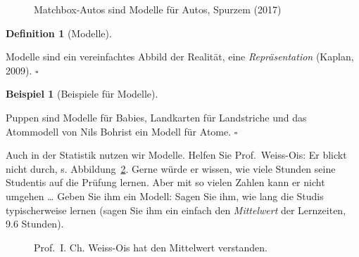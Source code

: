 \documentclass[
  letterpaper,
]{scrbook}
\theoremstyle{definition}
\theoremstyle{definition}
\newtheorem{example}{Beispiel}[chapter]
\theoremstyle{definition}
\newtheorem{definition}{Definition}[chapter]
\theoremstyle{remark}
\begin{document}
\begin{figure}


\caption{\label{fig-matchbox}Matchbox-Autos sind Modelle für Autos,
Spurzem (2017)}

\end{figure}%

\begin{definition}[Modelle]\protect\hypertarget{def-modelle}{}\label{def-modelle}

Modelle sind ein vereinfachtes Abbild der Realität, eine
\emph{Repräsentation} (Kaplan, 2009). \(\square\)

\end{definition}

\begin{example}[Beispiele für
Modelle]\protect\hypertarget{exm-Modelle}{}\label{exm-Modelle}

Puppen sind Modelle für Babies, Landkarten für Landstriche und das
Atommodell von Nils Bohrist ein Modell für Atome. \(\square\)

\end{example}

Auch in der Statistik nutzen wir Modelle. Helfen Sie Prof.~Weiss-Ois: Er
blickt nicht durch, s. Abbildung~\ref{fig-prof-mw}. Gerne würde er
wissen, wie viele Stunden seine Studentis auf die Prüfung lernen. Aber
mit so vielen Zahlen kann er nicht umgehen \ldots{} Geben Sie ihm ein
Modell: Sagen Sie ihm, wie lang die Studis typischerweise lernen (sagen
Sie ihm ein einfach den \emph{Mittelwert} der Lernzeiten, 9.6 Stunden).

\begin{figure}


\caption{\label{fig-prof-mw}Prof.~I. Ch. Weiss-Ois hat den Mittelwert
verstanden.}

\end{figure}%
\end{document}
